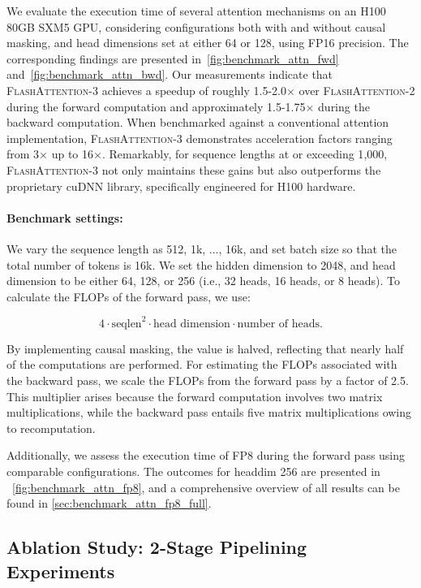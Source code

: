 \begin{enumerate}
We evaluate the execution time of several attention mechanisms on an H100 80GB SXM5 GPU, considering configurations both with and without causal masking, and head dimensions set at either 64 or 128, using FP16 precision. The corresponding findings are presented in~\cref{fig:benchmark_attn_fwd} and~\cref{fig:benchmark_attn_bwd}. Our measurements indicate that \textsc{FlashAttention-3} achieves a speedup of roughly 1.5-2.0$\times$ over \textsc{FlashAttention-2} during the forward computation and approximately 1.5-1.75$\times$ during the backward computation. When benchmarked against a conventional attention implementation, \textsc{FlashAttention-3} demonstrates acceleration factors ranging from 3$\times$ up to 16$\times$. Remarkably, for sequence lengths at or exceeding 1{,}000, \textsc{FlashAttention-3} not only maintains these gains but also outperforms the proprietary cuDNN library, specifically engineered for H100 hardware.

\paragraph{Benchmark settings:} We vary the sequence length as 512, 1k, ..., 16k, and set batch size so that the total number of tokens is 16k. We set the hidden dimension to 2048, and head dimension to be either 64, 128, or 256 (i.e., 32 heads, 16 heads, or 8 heads). To calculate the FLOPs of the forward pass, we use:

\begin{equation*}
  4 \cdot \text{seqlen}^2 \cdot \text{head dimension} \cdot \text{number of heads}.
\end{equation*}

By implementing causal masking, the value is halved, reflecting that nearly half of the computations are performed. For estimating the FLOPs associated with the backward pass, we scale the FLOPs from the forward pass by a factor of 2.5. This multiplier arises because the forward computation involves two matrix multiplications, while the backward pass entails five matrix multiplications owing to recomputation.

Additionally, we assess the execution time of FP8 during the forward pass using comparable configurations. The outcomes for headdim 256 are presented in ~\cref{fig:benchmark_attn_fp8}, and a comprehensive overview of all results can be found in \cref{sec:benchmark_attn_fp8_full}.

\subsection{Ablation Study: 2-Stage Pipelining Experiments}
\label{sec:2-stage-pipelining-experiments}


\end{enumerate}
